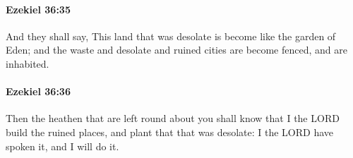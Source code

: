 		\paragraph{Ezekiel 36:35} %
			\label{EZEKIEL-36-35}

			And they shall say, This land that was desolate is become like the garden of Eden; and the waste and desolate and ruined cities are become fenced, and are inhabited.


		\paragraph{Ezekiel 36:36} %
			\label{EZEKIEL-36-36}

			Then the heathen that are left round about you shall know that I the LORD build the ruined places, and plant that that was desolate: I the LORD have spoken it, and I will do it.


